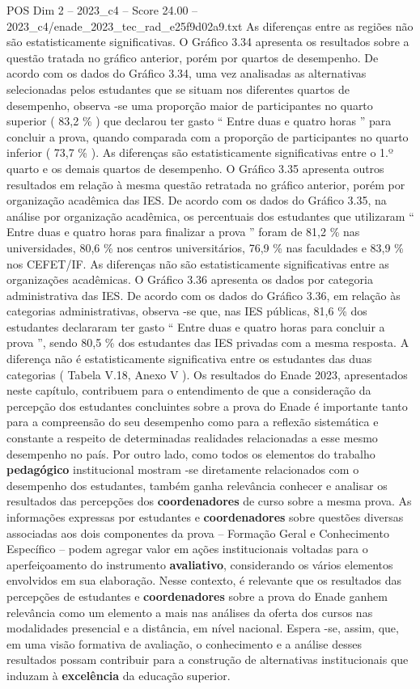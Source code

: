 \begin{textsample}{POS Dim 2 – 2023\_c4 – Score 24.00 – 2023\_c4/enade\_2023\_tec\_rad\_e25f9d02a9.txt}
As diferenças entre as regiões não são estatisticamente significativas.
O Gráfico 3.34 apresenta os resultados sobre a questão tratada no gráfico anterior, porém por quartos de desempenho.
De acordo com os dados do Gráfico 3.34, uma vez analisadas as alternativas selecionadas pelos estudantes que se situam nos diferentes quartos de desempenho, observa -se uma proporção maior de participantes no quarto superior ( 83,2 \% ) que declarou ter gasto “ Entre duas e quatro horas ” para concluir a prova, quando comparada com a proporção de participantes no quarto inferior ( 73,7 \% ).
As diferenças são estatisticamente significativas entre o 1.º quarto e os demais quartos de desempenho.
O Gráfico 3.35 apresenta outros resultados em relação à mesma questão retratada no gráfico anterior, porém por organização acadêmica das IES.
De acordo com os dados do Gráfico 3.35, na análise por organização acadêmica, os percentuais dos estudantes que utilizaram “ Entre duas e quatro horas para finalizar a prova ” foram de 81,2 \% nas universidades, 80,6 \% nos centros universitários, 76,9 \% nas faculdades e 83,9 \% nos CEFET/IF.
As diferenças não são estatisticamente significativas entre as organizações acadêmicas.
O Gráfico 3.36 apresenta os dados por categoria administrativa das IES.
De acordo com os dados do Gráfico 3.36, em relação às categorias administrativas, observa -se que, nas IES públicas, 81,6 \% dos estudantes declararam ter gasto “ Entre duas e quatro horas para concluir a prova ”, sendo 80,5 \% dos estudantes das IES privadas com a mesma resposta.
A diferença não é estatisticamente significativa entre os estudantes das duas categorias ( Tabela V.18, Anexo V ).
Os resultados do Enade 2023, apresentados neste capítulo, contribuem para o entendimento de que a consideração da percepção dos estudantes concluintes sobre a prova do Enade é importante tanto para a compreensão do seu desempenho como para a reflexão sistemática e constante a respeito de determinadas realidades relacionadas a esse mesmo desempenho no país.
Por outro lado, como todos os elementos do trabalho \textbf{pedagógico} institucional mostram -se diretamente relacionados com o desempenho dos estudantes, também ganha relevância conhecer e analisar os resultados das percepções dos \textbf{coordenadores} de curso sobre a mesma prova.
As informações expressas por estudantes e \textbf{coordenadores} sobre questões diversas associadas aos dois componentes da prova – Formação Geral e Conhecimento Específico – podem agregar valor em ações institucionais voltadas para o aperfeiçoamento do instrumento \textbf{avaliativo}, considerando os vários elementos envolvidos em sua elaboração.
Nesse contexto, é relevante que os resultados das percepções de estudantes e \textbf{coordenadores} sobre a prova do Enade ganhem relevância como um elemento a mais nas análises da oferta dos cursos nas modalidades presencial e a distância, em nível nacional.
Espera -se, assim, que, em uma visão formativa de avaliação, o conhecimento e a análise desses resultados possam contribuir para a construção de alternativas institucionais que induzam à \textbf{excelência} da educação superior.


\end{textsample}
